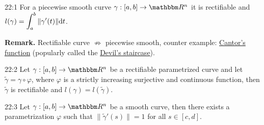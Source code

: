 \documentclass[../Analysis-3]{subfiles}
\begin{document}
\begin{Thm}{}{22:1}
    For a piecewise smooth curve $\gamma : [a,b] \to \R^n$ it is rectifiable and $l(\gamma) = \displaystyle\int_a^b \norm{\gamma'(t)} \dd t $.
\end{Thm}

\textbf{Remark.} Rectifiable curve $\not\Rightarrow$ piecewise smooth, counter example: \href{https://en.wikipedia.org/wiki/Cantor_function}{Cantor's function} (popularly called the \href{https://mathweb.ucsd.edu/~bseward/140b_spring20/Devils-Staircase.pdf}{Devil's staircase}).

\begin{Thm}{}{22:2}
    Let $\gamma : [a,b] \to \R^n$ be a rectifiable parametrized curve and let $\tilde{\gamma} = \gamma \circ \varphi$, where $\varphi$ is a strictly increasing surjective and continuous function, then $\tilde{\gamma}$ is rectifiable and $l(\gamma) = l(\tilde{\gamma})$.
\end{Thm}

\begin{Thm}{}{22:3}
    Let $\gamma : [a,b] \to \R^n$ be a smooth curve, then there exists a parametrization $\varphi$ such that $\| \tilde{\gamma}'(s) \| = 1$ for all $s \in [c,d]$.
\end{Thm}
\end{document}

